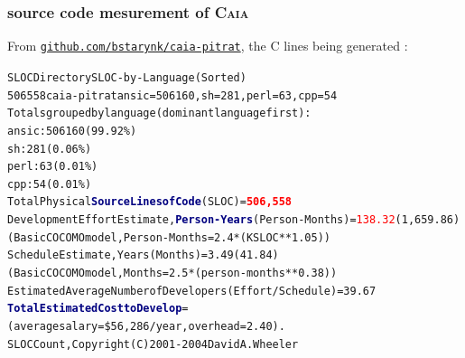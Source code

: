 \documentclass[xcolor=svgnames,final,smaller,a4]{beamer}
\begin{document}
 \begin{frame}
   \frametitle{source code mesurement of \textsc{Caia}}

   From \href{https://github.com/bstarynk/caia-pitrat}{\texttt{github.com/bstarynk/caia-pitrat}}, the C lines being generated :

   \begin{relsize}{-1}
   \begin{alltt}
  SLOC	Directory	SLOC-by-Language (Sorted)\\
506558  caia-pitrat     ansic=506160,sh=281,perl=63,cpp=54\\

Totals grouped by language (dominant language first):\\
ansic:       506160 (99.92\%)\\
sh:             281 (0.06\%)\\
perl:            63 (0.01\%)\\
cpp:             54 (0.01\%)\\

Total Physical \textcolor{Navy}{\textbf{Source Lines of Code}} (SLOC)                = \textcolor{red}{\textbf{\large 506,558}}\\
Development Effort Estimate, \textcolor{Navy}{\textbf{Person-Years}} (Person-Months) = \textcolor{red}{138.32} (1,659.86)\\
 (Basic COCOMO model, Person-Months = 2.4 * (KSLOC**1.05))\\
Schedule Estimate, Years (Months)                         = 3.49 (41.84)\\
 (Basic COCOMO model, Months = 2.5 * (person-months**0.38))\\
Estimated Average Number of Developers (Effort/Schedule)  = 39.67\\
\textcolor{Navy}{\textbf{Total Estimated Cost to Develop}}                           = {}\\
 (average salary = \$56,286/year, overhead = 2.40).\\
SLOCCount, Copyright (C) 2001-2004 David A. Wheeler
   \end{alltt}
   \end{relsize}
 \end{frame}
 
\end{document}
